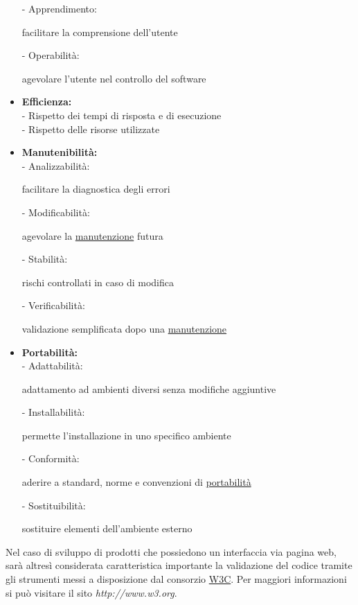 \documentclass[11pt,a4paper]{article}
\begin{document}
\begin{itemize}
		- Apprendimento: \begin{small}facilitare la comprensione dell'utente \\\end{small}
		- Operabilità: \begin{small}agevolare l'utente nel controllo del software \end{small}
	\item \textbf{Efficienza:} \\
		- Rispetto dei tempi di risposta e di esecuzione \\
		- Rispetto delle risorse utilizzate
	\item \textbf{Manutenibilità:} \\
		- Analizzabilità: \begin{small}facilitare la diagnostica degli errori \\\end{small}
		- Modificabilità: \begin{small}agevolare la \underline{manutenzione} futura \\\end{small}
		- Stabilità: \begin{small} rischi controllati in caso di modifica\\\end{small}
		- Verificabilità: \begin{small}validazione semplificata dopo una \underline{manutenzione}\end{small}
	\item \textbf{Portabilità:} \\
		- Adattabilità: \begin{small}adattamento ad ambienti diversi senza modifiche aggiuntive\\\end{small}
		- Installabilità: \begin{small}permette l'installazione in uno specifico ambiente \\\end{small}
		- Conformità: \begin{small}aderire a standard, norme e convenzioni di \underline{portabilità} \\\end{small}
		- Sostituibilità: \begin{small}sostituire elementi dell'ambiente esterno \end{small}
\end{itemize}
Nel caso di sviluppo di prodotti che possiedono un interfaccia via pagina web, sarà altresì considerata caratteristica importante la validazione del codice tramite gli strumenti messi a disposizione dal consorzio \underline{W3C}. Per maggiori informazioni si può visitare il sito \textit{http://www.w3.org}.
\end{document}
